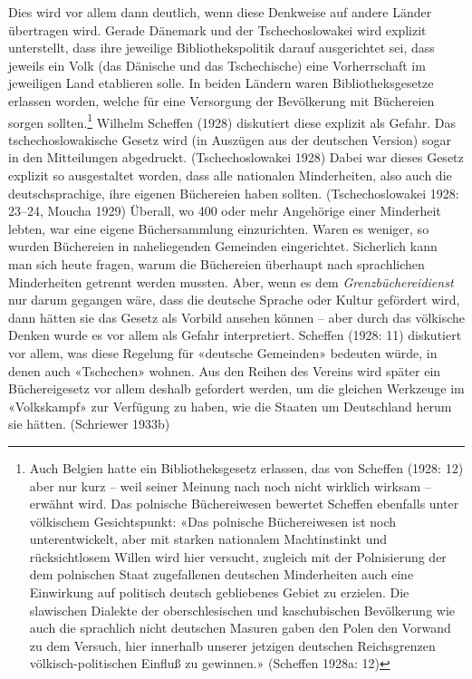\documentclass[a4paper,
fontsize=11pt,
oneside,
numbers=noperiodatend,
parskip=half-,
bibliography=totoc,
final
]{scrartcl}
\begin{document}
Dies wird vor allem dann deutlich, wenn diese Denkweise auf andere
Länder übertragen wird. Gerade Dänemark und der Tschechoslowakei wird
explizit unterstellt, dass ihre jeweilige Bibliothekspolitik darauf
ausgerichtet sei, dass jeweils ein Volk (das Dänische und das
Tschechische) eine Vorherrschaft im jeweiligen Land etablieren solle. In
beiden Ländern waren Bibliotheksgesetze erlassen worden, welche für eine
Versorgung der Bevölkerung mit Büchereien sorgen sollten.\footnote{Auch
  Belgien hatte ein Bibliotheksgesetz erlassen, das von Scheffen (1928:
  12) aber nur kurz -- weil seiner Meinung nach noch nicht wirklich
  wirksam -- erwähnt wird. Das polnische Büchereiwesen bewertet Scheffen
  ebenfalls unter völkischem Gesichtspunkt: «Das polnische Büchereiwesen
  ist noch unterentwickelt, aber mit starken nationalem Machtinstinkt
  und rücksichtlosem Willen wird hier versucht, zugleich mit der
  Polnisierung der dem polnischen Staat zugefallenen deutschen
  Minderheiten auch eine Einwirkung auf politisch deutsch gebliebenes
  Gebiet zu erzielen. Die slawischen Dialekte der oberschlesischen und
  kaschubischen Bevölkerung wie auch die sprachlich nicht deutschen
  Masuren gaben den Polen den Vorwand zu dem Versuch, hier innerhalb
  unserer jetzigen deutschen Reichsgrenzen völkisch-politischen Einfluß
  zu gewinnen.» (Scheffen 1928a: 12)} Wilhelm Scheffen (1928) diskutiert
diese explizit als Gefahr. Das tschechoslowakische Gesetz wird (in
Auszügen aus der deutschen Version) sogar in den Mitteilungen
abgedruckt. (Tschechoslowakei 1928) Dabei war dieses Gesetz explizit so
ausgestaltet worden, dass alle nationalen Minderheiten, also auch die
deutschsprachige, ihre eigenen Büchereien haben sollten.
(Tschechoslowakei 1928: 23--24, Moucha 1929) Überall, wo 400 oder mehr
Angehörige einer Minderheit lebten, war eine eigene Büchersammlung
einzurichten. Waren es weniger, so wurden Büchereien in naheliegenden
Gemeinden eingerichtet. Sicherlich kann man sich heute fragen, warum die
Büchereien überhaupt nach sprachlichen Minderheiten getrennt werden
mussten. Aber, wenn es dem \emph{Grenzbüchereidienst} nur darum gegangen
wäre, dass die deutsche Sprache oder Kultur gefördert wird, dann hätten
sie das Gesetz als Vorbild ansehen können -- aber durch das völkische
Denken wurde es vor allem als Gefahr interpretiert. Scheffen (1928: 11)
diskutiert vor allem, was diese Regelung für «deutsche Gemeinden»
bedeuten würde, in denen auch «Tschechen» wohnen. Aus den Reihen des
Vereins wird später ein Büchereigesetz vor allem deshalb gefordert
werden, um die gleichen Werkzeuge im «Volkskampf» zur Verfügung zu
haben, wie die Staaten um Deutschland herum sie hätten. (Schriewer
1933b)
\end{document}
